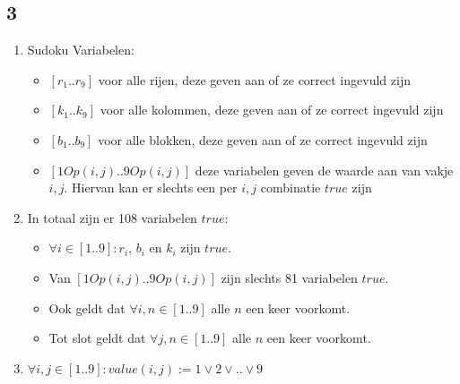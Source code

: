 \documentclass[]{article}
\begin{document}
  \subsection*{3}
  \begin{enumerate}[a]
    \item Sudoku Variabelen:
    \begin{itemize}
      \item $ [r_1 .. r_9] $ voor alle rijen, deze geven aan of ze correct ingevuld zijn
      \item $ [k_1 .. k_9] $ voor alle kolommen, deze geven aan of ze correct ingevuld zijn
      \item $ [b_1 .. b_9] $ voor alle blokken, deze geven aan of ze correct ingevuld zijn
      \item $ [1Op(i,j) .. 9Op(i,j)] $ deze variabelen geven de waarde aan van vakje $i,j$. Hiervan kan er slechts een per $i,j$ combinatie $true$ zijn
    \end{itemize}
    \item In totaal zijn er 108 variabelen $true$:
    \begin{itemize}
      \item $ \forall i \in [1..9] : r_i $, $b_i$ en $k_i$ zijn $true$.
      \item Van $ [1Op(i,j) .. 9Op(i,j)] $ zijn slechts 81 variabelen $true$.
      \item Ook geldt dat $\forall i,n \in [1..9]$ alle $n$ een keer voorkomt.
      \item Tot slot geldt dat $\forall j,n \in [1..9]$ alle $n$ een keer voorkomt.
    \end{itemize}
    \item $\forall i,j \in [1..9]: value(i,j) := 1 \lor 2 \lor .. \lor 9$
  \end{enumerate}
\end{document}
